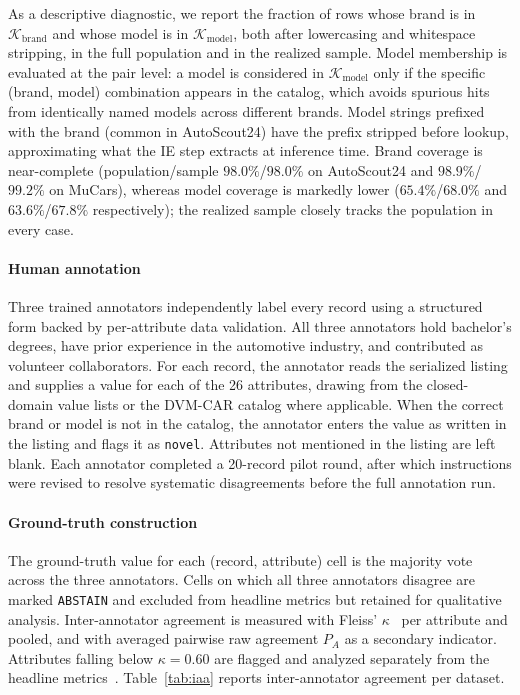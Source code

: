 \documentclass[conference]{IEEEtran}
\begin{document}
As a descriptive diagnostic, we report the fraction of rows whose
brand is in $\mathcal{K}_{\text{brand}}$ and whose model is in
$\mathcal{K}_{\text{model}}$, both after lowercasing and whitespace
stripping, in the full population and in the realized sample. Model
membership is evaluated at the pair level: a model is considered in
$\mathcal{K}_{\text{model}}$ only if the specific (brand, model)
combination appears in the catalog, which avoids spurious hits from
identically named models across different brands. Model strings
prefixed with the brand (common in AutoScout24) have the prefix
stripped before lookup, approximating what the IE step extracts at
inference time. Brand coverage is near-complete (population/sample
$98.0\%$/$98.0\%$ on AutoScout24 and $98.9\%$/$99.2\%$ on MuCars),
whereas model coverage is markedly lower ($65.4\%$/$68.0\%$ and
$63.6\%$/$67.8\%$ respectively); the realized sample closely tracks
the population in every case.

\paragraph{Human annotation}
Three trained annotators independently label every record using a
structured form backed by per-attribute data validation. All three
annotators hold bachelor's degrees, have prior experience in the
automotive industry, and contributed as volunteer collaborators. For each record,
the annotator reads the serialized listing and supplies a value for each
of the 26 attributes, drawing from the closed-domain value lists or the
DVM-CAR catalog where applicable. When the correct brand or model is not
in the catalog, the annotator enters the value as written in the listing
and flags it as \texttt{novel}. Attributes not mentioned in the listing
are left blank. Each annotator completed a 20-record pilot round, after
which instructions were revised to resolve systematic disagreements
before the full annotation run.

\paragraph{Ground-truth construction}
The ground-truth value for each (record, attribute) cell is the majority
vote across the three annotators. Cells on which all three annotators
disagree are marked \texttt{ABSTAIN} and excluded from headline metrics but
retained for qualitative analysis. Inter-annotator agreement is measured
with Fleiss' $\kappa$~\cite{fleiss1971kappa} per attribute and pooled, and
with averaged pairwise raw agreement $P_A$ as a secondary indicator.
Attributes falling below $\kappa = 0.60$ are flagged and analyzed separately
from the headline metrics~\cite{landis1977kappa}.
Table~\ref{tab:iaa} reports inter-annotator agreement per dataset.
\end{document}
